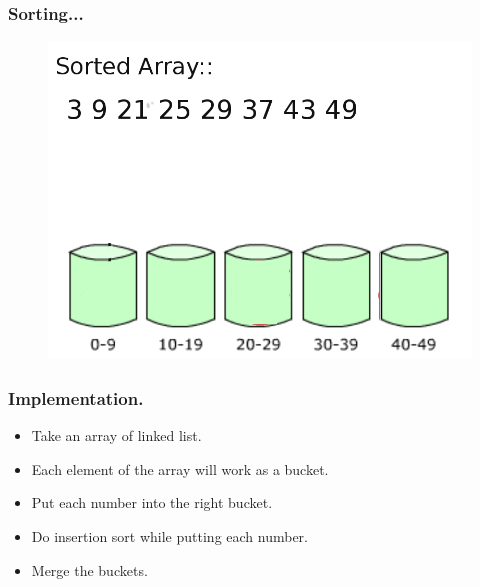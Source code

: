 \documentclass[pdf]{beamer}
\begin{document}
\begin{frame}
	\frametitle{Sorting...}
	\begin{figure}
		\includegraphics[scale=.3]{Figure/22.png}
	\end{figure}	
\end{frame}

\begin{frame}
	\frametitle{Implementation.}
	\begin{itemize}
		\pause
		\item Take an array of linked list.
		\pause	
		\item Each element of the array will work as a bucket.
		\pause		
		\item Put each number into the right bucket.
		\pause		
		\item Do insertion sort while putting each number.
		\pause		
		\item Merge the buckets.
	\end{itemize}
\end{frame}

\begin{frame}
	
\end{frame}
\end{document}
